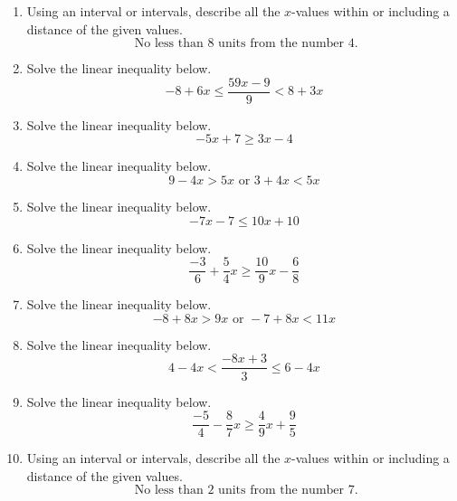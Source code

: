 \documentclass[14pt]{extbook}
\begin{document}
\begin{enumerate}
\item{
Using an interval or intervals, describe all the $x$-values within or including a distance of the given values.\[ \text{ No less than } 8 \text{ units from the number } 4. \]} \newpage
\item{
Solve the linear inequality below.\[ -8 + 6 x \leq \frac{59 x - 9}{9} < 8 + 3 x \]} \newpage
\item{
Solve the linear inequality below.\[ -5x + 7 \geq 3x -4 \]} \newpage
\item{
Solve the linear inequality below.\[ 9 - 4 x > 5 x \text{ or } 3 + 4 x < 5 x \]} \newpage
\item{
Solve the linear inequality below.\[ -7x -7 \leq 10x + 10 \]} \newpage
\item{
Solve the linear inequality below.\[ \frac{-3}{6} + \frac{5}{4} x \geq \frac{10}{9} x - \frac{6}{8} \]} \newpage
\item{
Solve the linear inequality below.\[ -8 + 8 x > 9 x \text{ or } -7 + 8 x < 11 x \]} \newpage
\item{
Solve the linear inequality below.\[ 4 - 4 x < \frac{-8 x + 3}{3} \leq 6 - 4 x \]} \newpage
\item{
Solve the linear inequality below.\[ \frac{-5}{4} - \frac{8}{7} x \geq \frac{4}{9} x + \frac{9}{5} \]} \newpage
\item{
Using an interval or intervals, describe all the $x$-values within or including a distance of the given values.\[ \text{ No less than } 2 \text{ units from the number } 7. \]} \newpage
\end{enumerate}
\end{document}

